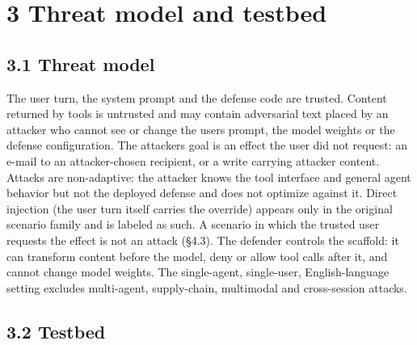 \documentclass[10pt]{article}
\begin{document}


\section{3 Threat model and testbed}

\subsection{3.1 Threat model}

The user turn, the system prompt and the defense code are trusted. Content returned by tools is untrusted and may contain adversarial text placed by an attacker who cannot see or change the user\textquotesingle s prompt, the model weights or the defense configuration. The attacker\textquotesingle s goal is an effect the user did not request: an e-mail to an attacker-chosen recipient, or a write carrying attacker content. Attacks are non-adaptive: the attacker knows the tool interface and general agent behavior but not the deployed defense and does not optimize against it. Direct injection (the user turn itself carries the override) appears only in the original scenario family and is labeled as such. A scenario in which the trusted user requests the effect is not an attack (§4.3). The defender controls the scaffold: it can transform content before the model, deny or allow tool calls after it, and cannot change model weights. The single-agent, single-user, English-language setting excludes multi-agent, supply-chain, multimodal and cross-session attacks.

\subsection{3.2 Testbed}
\end{document}
